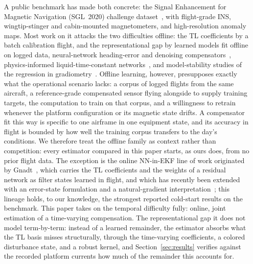 \documentclass{IEEEtaes}
\begin{document}
A public benchmark has made both concrete: the Signal Enhancement for Magnetic
Navigation (SGL~2020) challenge dataset~\cite{gnadt2020}, with flight-grade INS,
wingtip-stinger and cabin-mounted magnetometers, and high-resolution anomaly maps.
Most work on it attacks the two difficulties offline: the TL coefficients by a
batch calibration flight, and the representational gap by learned models fit offline
on logged data, neural-network heading-error and denoising
compensators~\cite{williams1993,gnadt2022}, physics-informed liquid-time-constant
networks~\cite{nerrise2024}, and model-stability studies of the regression in
gradiometry~\cite{noriega2015}. Offline learning, however, presupposes exactly
what the operational scenario lacks: a corpus of logged flights from the same
aircraft, a reference-grade compensated sensor flying alongside to supply training
targets, the computation to train on that corpus, and a willingness to retrain
whenever the platform configuration or its magnetic state drifts. A compensator
fit this way is specific to one airframe in one equipment state, and its accuracy
in flight is bounded by how well the training corpus transfers to the day's
conditions. We therefore treat the offline family as context rather than
competition: every estimator compared in this paper starts, as ours does, from no
prior flight data. The exception is the online NN-in-EKF line of work
originated by Gnadt~\cite{gnadt2022}, which carries the TL coefficients and the
weights of a residual network as filter states learned in flight, and which has
recently been extended with an error-state formulation and a natural-gradient
interpretation~\cite{hager2026}; this lineage holds, to our knowledge, the
strongest reported cold-start results on the benchmark. This paper takes on the
temporal difficulty fully: online, joint estimation of a time-varying
compensation. The representational gap it does not model term-by-term: instead of a
learned remainder, the estimator absorbs what the TL basis misses structurally,
through the time-varying coefficients, a colored disturbance state, and a robust
kernel, and Section~\ref{sec:results} verifies against the recorded platform
currents how much of the remainder this accounts for.
\end{document}
